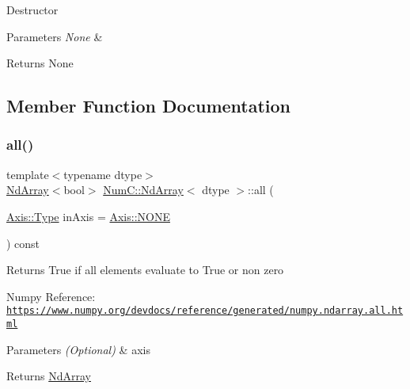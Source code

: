 Destructor


\begin{DoxyParams}{Parameters}
{\em None} & \\
\hline
\end{DoxyParams}
\begin{DoxyReturn}{Returns}
None 
\end{DoxyReturn}


\subsection{Member Function Documentation}
\mbox{\label{class_num_c_1_1_nd_array_a4f8be2e4a1cb8e27f56ea7f9487fd029}} 
\subsubsection{\texorpdfstring{all()}{all()}}
{\footnotesize\ttfamily template$<$typename dtype$>$ \\
\mbox{\hyperlink{class_num_c_1_1_nd_array}{Nd\+Array}}$<$bool$>$ \mbox{\hyperlink{class_num_c_1_1_nd_array}{Num\+C\+::\+Nd\+Array}}$<$ dtype $>$\+::all (\begin{DoxyParamCaption}\item[{\mbox{\hyperlink{struct_num_c_1_1_axis_a8e689044ef1941a03482e730c5e7ebb3}{Axis\+::\+Type}}}]{in\+Axis = {\ttfamily \mbox{\hyperlink{struct_num_c_1_1_axis_a8e689044ef1941a03482e730c5e7ebb3a0ae033c4226f7184bf0050b101e7ed94}{Axis\+::\+N\+O\+NE}}} }\end{DoxyParamCaption}) const\hspace{0.3cm}{\ttfamily [inline]}}

Returns True if all elements evaluate to True or non zero

Numpy Reference\+: \href{https://www.numpy.org/devdocs/reference/generated/numpy.ndarray.all.html}{\tt https\+://www.\+numpy.\+org/devdocs/reference/generated/numpy.\+ndarray.\+all.\+html}


\begin{DoxyParams}{Parameters}
{\em (\+Optional)} & axis \\
\hline
\end{DoxyParams}
\begin{DoxyReturn}{Returns}
\mbox{\hyperlink{class_num_c_1_1_nd_array}{Nd\+Array}} 
\end{DoxyReturn}
\mbox{\label{class_num_c_1_1_nd_array_ab303bf5141b46d0025b73a036804d6c3}} 
